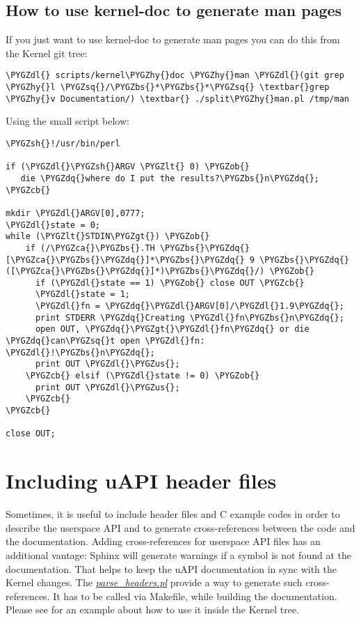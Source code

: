\documentclass[a4paper,8pt,english]{sphinxmanual}
\def\PYGZbs{\char`\\}
\def\PYGZus{\char`\_}
\def\PYGZob{\char`\{}
\def\PYGZcb{\char`\}}
\def\PYGZca{\char`\^}
\def\PYGZlt{\char`\<}
\def\PYGZgt{\char`\>}
\def\PYGZsh{\char`\#}
\def\PYGZdl{\char`\$}
\def\PYGZhy{\char`\-}
\def\PYGZsq{\char`\'}
\def\PYGZdq{\char`\"}
\renewcommand\PYGZsq{\textquotesingle}
\begin{document}
\section{How to use kernel-doc to generate man pages}
\label{doc-guide/kernel-doc:how-to-use-kernel-doc-to-generate-man-pages}
If you just want to use kernel-doc to generate man pages you can do this
from the Kernel git tree:

\begin{Verbatim}[commandchars=\\\{\}]
\PYGZdl{} scripts/kernel\PYGZhy{}doc \PYGZhy{}man \PYGZdl{}(git grep \PYGZhy{}l \PYGZsq{}/\PYGZbs{}*\PYGZbs{}*\PYGZsq{} \textbar{}grep \PYGZhy{}v Documentation/) \textbar{} ./split\PYGZhy{}man.pl /tmp/man
\end{Verbatim}

Using the small  script below:

\begin{Verbatim}[commandchars=\\\{\}]
\PYGZsh{}!/usr/bin/perl

if (\PYGZdl{}\PYGZsh{}ARGV \PYGZlt{} 0) \PYGZob{}
   die \PYGZdq{}where do I put the results?\PYGZbs{}n\PYGZdq{};
\PYGZcb{}

mkdir \PYGZdl{}ARGV[0],0777;
\PYGZdl{}state = 0;
while (\PYGZlt{}STDIN\PYGZgt{}) \PYGZob{}
    if (/\PYGZca{}\PYGZbs{}.TH \PYGZbs{}\PYGZdq{}[\PYGZca{}\PYGZbs{}\PYGZdq{}]*\PYGZbs{}\PYGZdq{} 9 \PYGZbs{}\PYGZdq{}([\PYGZca{}\PYGZbs{}\PYGZdq{}]*)\PYGZbs{}\PYGZdq{}/) \PYGZob{}
      if (\PYGZdl{}state == 1) \PYGZob{} close OUT \PYGZcb{}
      \PYGZdl{}state = 1;
      \PYGZdl{}fn = \PYGZdq{}\PYGZdl{}ARGV[0]/\PYGZdl{}1.9\PYGZdq{};
      print STDERR \PYGZdq{}Creating \PYGZdl{}fn\PYGZbs{}n\PYGZdq{};
      open OUT, \PYGZdq{}\PYGZgt{}\PYGZdl{}fn\PYGZdq{} or die \PYGZdq{}can\PYGZsq{}t open \PYGZdl{}fn: \PYGZdl{}!\PYGZbs{}n\PYGZdq{};
      print OUT \PYGZdl{}\PYGZus{};
    \PYGZcb{} elsif (\PYGZdl{}state != 0) \PYGZob{}
      print OUT \PYGZdl{}\PYGZus{};
    \PYGZcb{}
\PYGZcb{}

close OUT;
\end{Verbatim}


\chapter{Including uAPI header files}
\label{doc-guide/parse-headers:including-uapi-header-files}\label{doc-guide/parse-headers::doc}
Sometimes, it is useful to include header files and C example codes in
order to describe the userspace API and to generate cross-references
between the code and the documentation. Adding cross-references for
userspace API files has an additional vantage: Sphinx will generate warnings
if a symbol is not found at the documentation. That helps to keep the
uAPI documentation in sync with the Kernel changes.
The {\hyperref[doc\string-guide/parse\string-headers:parse\string-headers]{\emph{parse\_headers.pl}}} provide a way to generate such
cross-references. It has to be called via Makefile, while building the
documentation. Please see  for an example
about how to use it inside the Kernel tree.
\end{document}
